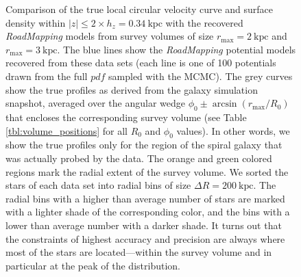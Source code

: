 \documentclass[iop,revtex4,numberedappendix,appendixfloats]{emulateapj}
\newcommand{\RM}{{\sl RoadMapping}}
\begin{document}
\begin{figure}[!htbp]
\centering
\caption{Comparison of the true local circular velocity curve and surface density within $|z| \leq 2 \times h_z = 0.34~\text{kpc}$ with the recovered \RM{} models from survey volumes of size $r_\text{max}=2~\text{kpc}$ and $r_\text{max}=3~\text{kpc}$. The blue lines show the \RM{} potential models recovered from these data sets (each line is one of 100 potentials drawn from the full $pdf$ sampled with the MCMC). The grey curves show the true profiles as derived from the galaxy simulation snapshot, averaged over the angular wedge $\phi_0\pm\arcsin(r_\text{max}/R_0)$ that encloses the corresponding survey volume (see Table \ref{tbl:volume_positions} for all $R_0$ and $\phi_0$ values). In other words, we show the true profiles only for the region of the spiral galaxy that was actually probed by the data. The orange and green colored regions mark the radial extent of the survey volume. We sorted the stars of each data set into radial bins of size $\Delta R = 200~\text{kpc}$. The radial bins with a higher than average number of stars are marked with a lighter shade of the corresponding color, and the bins with a lower than average number with a darker shade. It turns out that the constraints of highest accuracy and precision are always where most of the stars are located---within the survey volume and in particular at the peak of the distribution.}
    \label{fig:vcirc_surfdens_suite_medium}
\end{figure}
\end{document}
